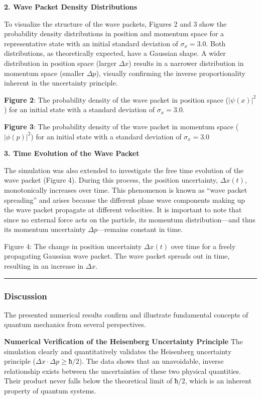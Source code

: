 \textbf{2. Wave Packet Density Distributions}

To visualize the structure of the wave packets, Figures 2 and 3 show the
probability density distributions in position and momentum space for a
representative state with an initial standard deviation of
\(σ_x = 3.0\). Both distributions, as theoretically expected, have a
Gaussian shape. A wider distribution in position space (larger \(Δx\))
results in a narrower distribution in momentum space (smaller \(Δp\)),
visually confirming the inverse proportionality inherent in the
uncertainty principle.

\textbf{Figure 2}: The probability density of the wave packet in
position space (\(|\psi(x)|^2\)) for an initial state with a standard
deviation of \(σ_x = 3.0\).

\textbf{Figure 3}: The probability density of the wave packet in
momentum space (\(|\phi(p)|^2\)) for an initial state with a standard
deviation of \(σ_x = 3.0\)

\textbf{3. Time Evolution of the Wave Packet}

The simulation was also extended to investigate the free time evolution
of the wave packet (Figure 4). During this process, the position
uncertainty, \(Δx(t)\), monotonically increases over time. This
phenomenon is known as ``wave packet spreading'' and arises because the
different plane wave components making up the wave packet propagate at
different velocities. It is important to note that since no external
force acts on the particle, its momentum distribution---and thus its
momentum uncertainty \(Δp\)---remains constant in time.

Figure 4: The change in position uncertainty \(Δx(t)\) over time for a
freely propagating Gaussian wave packet. The wave packet spreads out in
time, resulting in an increase in \(Δx\).

\begin{center}\rule{0.5\linewidth}{0.5pt}\end{center}

\subsubsection{Discussion}\label{discussion}

The presented numerical results confirm and illustrate fundamental
concepts of quantum mechanics from several perspectives.

\textbf{Numerical Verification of the Heisenberg Uncertainty Principle}
The simulation clearly and quantitatively validates the Heisenberg
uncertainty principle (\(Δx·Δp ≥ ħ/2\)). The data shows that an
unavoidable, inverse relationship exists between the uncertainties of
these two physical quantities. Their product never falls below the
theoretical limit of \(ħ/2\), which is an inherent property of quantum
systems.

